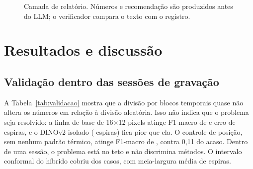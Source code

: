 \documentclass[11pt,a4paper]{article}
\begin{document}
\begin{figure}[t]
\centering
{}
\caption{Camada de relatório. Números e recomendação são produzidos antes do LLM; o verificador compara o texto com o registro.}
\label{fig:relatorio}
\end{figure}

\section{Resultados e discussão}

\subsection{Validação dentro das sessões de gravação}
A Tabela~\ref{tab:validacao} mostra que a divisão por blocos temporais quase não altera os números em relação à divisão aleatória. Isso não indica que o problema seja resolvido: a linha de base de 16$\times$12 pixels atinge F1-macro de \FUmBlocosTriv{} e erro de \MAEBlocosTriv{} espiras, e o DINOv2 isolado (\MAEBlocosDino{} espiras) fica pior que ela. O controle de posição, sem nenhum padrão térmico, atinge F1-macro de \FUmBlocosPos{}, contra 0,11 do acaso. Dentro de uma sessão, o problema está no teto e não discrimina métodos. O intervalo conformal do híbrido cobriu \CobBlocosHib{} dos casos, com meia-largura média de \MeiaBlocosHib{} espiras.
\end{document}

